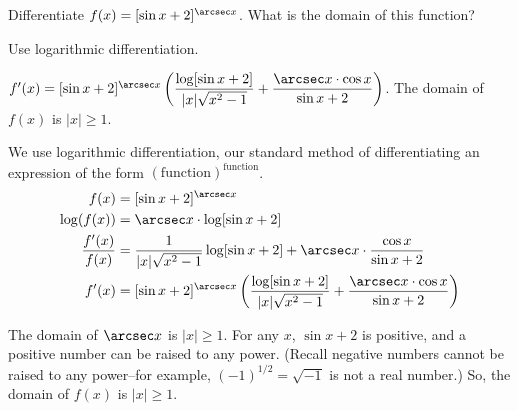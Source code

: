 \begin{question}
Differentiate $f(x)=[\sin x +2]^{\arcsec x}$. What is the domain of this function?
\end{question}
\begin{hint} Use logarithmic differentiation.
\end{hint}
\begin{answer}
$f'(x)=[\sin x +2]^{\arcsec x}\left(\dfrac{\log[\sin x +2]}{|x|\sqrt{x^2-1}}+ \dfrac{\arcsec x \cdot\cos x}{\sin x +2}\right)$. The domain of $f(x)$ is $|x|\ge 1$.
\end{answer}
\begin{solution}
We use logarithmic differentiation, our standard method of differentiating an expression of the form $(\mbox{function})^{\mbox{function}}$.
\begin{align*}
f(x)&=[\sin x +2]^{\arcsec x}\\
\log(f(x))&=\arcsec x \cdot \log[\sin x +2]\\
\frac{f'(x)}{f(x)}&=\frac{1}{|x|\sqrt{x^2-1}}\log[\sin x +2]+\arcsec x \cdot \frac{\cos x}{\sin x +2}\\
f'(x)&=[\sin x +2]^{\arcsec x}\left(\frac{\log[\sin x +2]}{|x|\sqrt{x^2-1}}+ \frac{\arcsec x \cdot\cos x}{\sin x +2}\right)
\end{align*}

The domain of $\arcsec x$ is $|x| \geq 1$. For any $x$, $\sin x +2$ is positive, and a positive number can be raised to any power. (Recall negative numbers cannot be raised to any power--for example, $(-1)^{1/2}=\sqrt{-1}$ is not a real number.) So, the domain of $f(x)$ is $|x| \geq 1$.
\end{solution}




